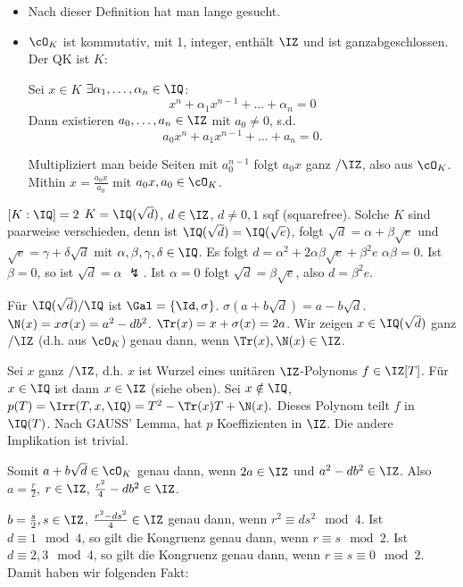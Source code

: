 \begin{Bemerkung}
 \begin{itemize}
  \item Nach dieser Definition hat man lange gesucht.
  \item $\cO_K$ ist kommutativ, mit 1, integer, enthält $\IZ$ und ist ganzabgeschlossen. Der QK ist $K$:
  
  Sei $x\in K$ \folge $\exists \alpha_1,\ldots,\alpha_n\in\IQ$:  \[ x^n+\alpha_1x^{n-1}+\ldots + \alpha_n=0\]
  Dann existieren $a_0,\ldots,a_n\in \IZ$ mit $a_0\neq 0$, s.d. \[ a_0x^n+ a_1x^{n-1}+\ldots+a_n=0.\]
  
  Multipliziert man beide Seiten mit $a_0^{n-1}$ folgt $a_0x$ ganz $/\IZ$, also aus $\cO_K$. Mithin $x=\frac{a_0x}{a_0}$ mit $a_0x,a_0\in \cO_K$.
 \end{itemize}
\end{Bemerkung}

\begin{Beispiel}
 $[K:\IQ]=2$ \gdw $K=\IQ(\sqrt{d})$, $d\in \IZ$, $d\neq 0,1$ sqf (squarefree). Solche $K$ sind paarweise verschieden, denn ist $\IQ(\sqrt d)=\IQ(\sqrt e)$, folgt $\sqrt d = \alpha + \beta \sqrt{e}$ und $\sqrt e= \gamma + \delta \sqrt d$ mit $\alpha,\beta,\gamma,\delta\in\IQ$. Es folgt $d=\alpha^2+2\alpha\beta\sqrt e +\beta^2e $ \folge $\alpha\beta=0$. Ist $\beta=0$, so ist $\sqrt{d}=\alpha$ $\lightning$.
 Ist $\alpha=0$ folgt $\sqrt d=\beta\sqrt e$, also $d=\beta^2 e$.
\end{Beispiel}

Für $\IQ(\sqrt d)/\IQ$ ist $\Gal=\{ \Id,\sigma\}$. $\sigma(a+b\sqrt{d})=a-b\sqrt d$. $\N(x)=x\sigma(x)=a^2-db^2$. $\Tr(x)=x+\sigma(x)=2a$.
Wir zeigen $x\in \IQ(\sqrt{d})$ ganz $/\IZ$ (d.h. aus $\cO_K$) genau dann, wenn $\Tr(x),\N(x)\in\IZ$.

\begin{Beweis}
 Sei $x$ ganz $/\IZ$, d.h. $x$ ist Wurzel eines unitären $\IZ$-Polynoms $f\in \IZ[T]$. Für $x\in \IQ$ ist dann $x\in\IZ$ (siehe oben). Sei $x\notin\IQ$, $p(T)=\Irr(T,x,\IQ)=T^2-\Tr(x)T+\N(x).$ Dieses Polynom teilt $f$ in $\IQ(T)$. Nach GAUSS' Lemma, hat $p$ Koeffizienten in $\IZ$. Die andere Implikation ist trivial. 
\end{Beweis}

Somit $a+b\sqrt d \in \cO_K$ genau dann, wenn $2a\in\IZ$ und $a^2-db^2\in\IZ$. Also $a=\frac{r}{2}$, $r\in\IZ$, $\frac{r^2}{4}-db^2\in\IZ$. 

$b=\frac{s}{2}, s\in\IZ$, $\frac{r^2-ds^2}{4}\in\IZ$ genau dann, wenn $r^2\equiv ds^2 \mod{4}$. Ist $d\equiv 1 \mod{4}$, so gilt die Kongruenz genau dann, wenn $r\equiv s \mod{2}$.
Ist $d\equiv 2,3 \mod{4}$, so gilt die Kongruenz genau dann, wenn $r\equiv s \equiv 0 \mod{2}$.
Damit haben wir folgenden Fakt:

